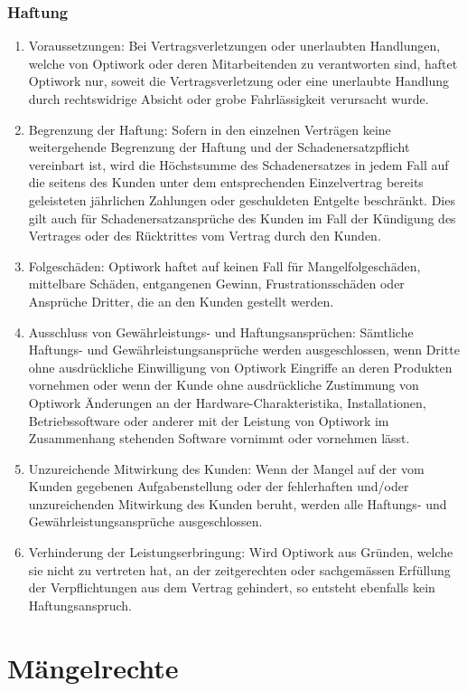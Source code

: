 \subsubsection*{Haftung}

\begin{enumerate}
  \item Voraussetzungen: Bei Vertragsverletzungen oder unerlaubten Handlungen, welche von Optiwork oder deren Mitarbeitenden zu verantworten sind, haftet Optiwork nur, soweit die Vertragsverletzung oder eine unerlaubte Handlung durch rechtswidrige Absicht oder grobe Fahrlässigkeit verursacht wurde.
  \item Begrenzung der Haftung: Sofern in den einzelnen Verträgen keine weitergehende Begrenzung der Haftung und der Schadenersatzpflicht vereinbart ist, wird die Höchstsumme des Schadenersatzes in jedem Fall auf die seitens des Kunden unter dem   entsprechenden Einzelvertrag bereits geleisteten jährlichen Zahlungen oder geschuldeten Entgelte beschränkt. Dies gilt auch für Schadenersatzansprüche des Kunden im Fall der Kündigung des Vertrages oder des Rücktrittes vom Vertrag durch den Kunden.
  \item Folgeschäden: Optiwork haftet auf keinen Fall für Mangelfolgeschäden, mittelbare Schäden, entgangenen Gewinn, Frustrationsschäden oder Ansprüche Dritter, die an den Kunden gestellt werden.
  \item Ausschluss von Gewährleistungs- und Haftungsansprüchen: Sämtliche Haftungs- und Gewährleistungsansprüche werden ausgeschlossen, wenn Dritte ohne ausdrückliche Einwilligung von Optiwork Eingriffe an deren Produkten vornehmen oder wenn der Kunde   ohne ausdrückliche Zustimmung von Optiwork Änderungen an der Hardware-Charakteristika, Installationen, Betriebssoftware oder anderer mit der Leistung von Optiwork im Zusammenhang stehenden Software vornimmt oder vornehmen lässt.
  \item Unzureichende Mitwirkung des Kunden: Wenn der Mangel auf der vom Kunden gegebenen Aufgabenstellung oder der fehlerhaften und/oder unzureichenden Mitwirkung des Kunden beruht, werden alle Haftungs- und Gewährleistungsansprüche ausgeschlossen.
  \item Verhinderung der Leistungserbringung: Wird Optiwork aus Gründen, welche sie nicht zu vertreten hat, an der zeitgerechten oder sachgemässen Erfüllung der Verpflichtungen aus dem Vertrag gehindert, so entsteht ebenfalls kein Haftungsanspruch.
\end{enumerate}

\section{Mängelrechte}

